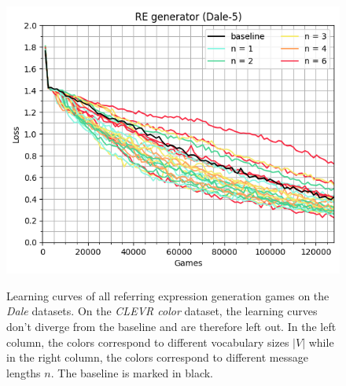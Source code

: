 \begin{figure}[ht!]
{        \includegraphics[width=0.485\linewidth]{figures/learning-curve_re-generator_dale-5_max-len.png}
        \label{fig:learning-curve_re-generator_dale-5_max-len}
    }
    \caption{Learning curves of all referring expression generation games on the \emph{Dale} datasets. On the \emph{CLEVR color} dataset, the learning curves don't diverge from the baseline and are therefore left out. In the left column, the colors correspond to different vocabulary sizes $|V|$ while in the right column, the colors correspond to different message lengths $n$. The baseline is marked in black.}
    \label{fig:learning-curves_re-generator}
\end{figure}

